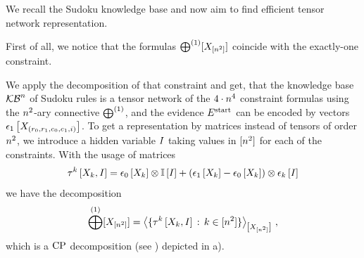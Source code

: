\begin{example}\label{exa:sudokuRepresentation}
    We recall the Sudoku knowledge base  and now aim to find efficient tensor network representation.

    First of all, we notice that the formulas $\bigoplus^{(1)}[X_{[n^2]}]$ coincide with the exactly-one constraint.


    We apply the decomposition of that constraint and get, that the knowledge base $\mathcal{KB}^{n}$ of Sudoku rules is a tensor network of the $4\cdot n^4$ constraint formulas using the $n^2$-ary connective $\bigoplus^{(1)}$, and the evidence $E^{\mathrm{start}}$ can be encoded by vectors $\epsilon_{1}\left[X_{(r_0,r_1,c_0,c_1,i)}\right]$.
    To get a representation by matrices instead of tensors of order $n^2$, we introduce a hidden variable $I$ taking values in $[n^2]$ for each of the constraints.
    With the usage of matrices
    \begin{align*}
        \tau^{k}\left[X_{k},I\right]
        = \epsilon_{0}\left[X_{k}\right] \otimes \mathbb{I}\left[I\right] + (\epsilon_{1}\left[X_{k}\right]-\epsilon_{0}\left[X_{k}\right]) \otimes \epsilon_{k}\left[I\right]
    \end{align*}
    we have the decomposition
    \begin{align*}
        \bigoplus^{(1)}[X_{[n^2]}]
        = \left\langle \{\tau^{k}\left[X_{k},I\right] \,:\, k\in[n^2]\}\right\rangle_{\left[ X_{[n^2]} \right]} \, ,
    \end{align*}
    which is a $\mathrm{CP}$ decomposition (see ) depicted in  a).


\end{example}
